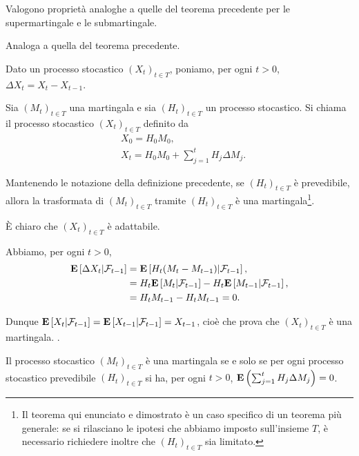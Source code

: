 \begin{Corollary}
	Valogono propriet\`a analoghe a quelle del teorema precedente per le supermartingale e le submartingale.
\end{Corollary}
\Proof Analoga a quella del teorema precedente. \EndProof
\par Dato un processo stocastico $(X_t)_{t \in T}$, poniamo, per ogni $t > 0$,  $\Delta X_t = X_t - X_{t - 1}$.
\begin{Definition}
	Sia $(M_t)_{t \in T}$ una martingala e sia $(H_t)_{t \in T}$ un processo stocastico. Si chiama  il processo stocastico $(X_t)_{t \in T}$ definito da
	\begin{align}
		&X_0 = H_0M_0,\nonumber\\
		&X_t = H_0M_0 + \sum_{j = 1}^t H_j\Delta M_j.\nonumber
	\end{align}
\end{Definition}
\begin{Theorem}
	Mantenendo le notazione della definizione precedente, se $(H_t)_{t \in T}$ \`e prevedibile, allora la trasformata di $(M_t)_{t \in T}$ tramite $(H_t)_{t \in T}$ \`e una martingala\footnote{Il teorema qui enunciato e dimostrato \`e un caso specifico di un teorema pi\`u generale: se si rilasciano le ipotesi che abbiamo imposto sull'insieme $T$, \`e necessario richiedere inoltre che $(H_t)_{t \in T}$ sia limitato.}.
\end{Theorem}
\Proof \`E chiaro che $(X_t)_{t \in T}$ \`e adattabile.
\par Abbiamo, per ogni $t > 0$,
\begin{align}
	\mathbf{E} \left [\Delta X_t|\mathcal{F}_{t - 1} \right ] &= \mathbf{E} \left [H_t (M_t - M_{t - 1})|\mathcal{F}_{t -1} \right ],\nonumber\\
	&= H_t\mathbf{E} \left [M_t|\mathcal{F}_{t - 1} \right ] - H_t\mathbf{E} \left [M_{t - 1}|\mathcal{F}_{t - 1} \right ],\nonumber\\
	&= H_tM_{t - 1} - H_t M_{t - 1} = 0.\nonumber
\end{align}
\par Dunque $\mathbf{E} \left [X_t|\mathcal{F}_{t - 1} \right ] = \mathbf{E} \left [X_{t - 1}|\mathcal{F}_{t - 1} \right ] = X_{t - 1}$, cio\`e che prova che $(X_t)_{t \in T}$ \`e una martingala. \EndProof.
\begin{Theorem}
	Il processo stocastico $(M_t)_{t \in T}$ \`e una martingala se e solo se per ogni processo stocastico prevedibile $(H_t)_{t \in T}$ si ha, per ogni $t > 0$,  $\mathbf{E} \left ( \sum_{j = 1}^t H_j \Delta M_j \right ) = 0$.
\end{Theorem}
